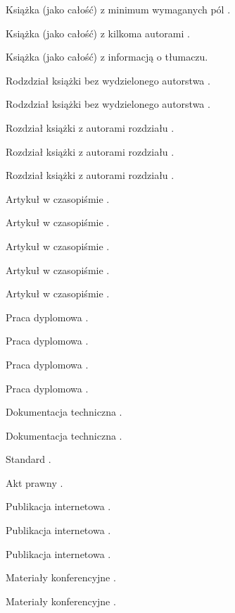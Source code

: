 \documentclass[a4paper, 12pt]{article}
\begin{document}
Książka (jako całość) z minimum wymaganych pól \cite{Gorski2023}.

Książka (jako całość) z kilkoma autorami \cite{Kurczab2016}.


Książka (jako całość) z informacją o tłumaczu. \cite{AlKhalili2022}

Rodzdział książki bez wydzielonego autorstwa \cite{Smith2018}.

Rodzdział książki bez wydzielonego autorstwa \cite{Peterson2019}.

Rozdział książki z autorami rozdziału \cite{Kraus2010}.

Rozdział książki z autorami rozdziału \cite{Isidori2023}.

Rozdział książki z autorami rozdziału \cite{Gregerson2010}.

Artykuł w czasopiśmie \cite{Nowak2023}.

Artykuł w czasopiśmie \cite{Xu2023}.

Artykuł w czasopiśmie \cite{Mashatan2007}.

Artykuł w czasopiśmie \cite{Hwang2006}.

Artykuł w czasopiśmie \cite{Joye2007}.

Praca dyplomowa \cite{Cwik2018}.

Praca dyplomowa \cite{Marszalek2023}.

Praca dyplomowa \cite{Urbanski2023}.

Praca dyplomowa \cite{Otto2004}.

Dokumentacja techniczna \cite{LPC2212}.

Dokumentacja techniczna \cite{NIST-SP-800-22}.

Standard \cite{FIPS140-2}.

Akt prawny \cite{ust2001-09-18}.

Publikacja internetowa \cite{Schneier2017}.

Publikacja internetowa \cite{Craddock2017}.

Publikacja internetowa \cite{MatlabPerformance2015}.

Materiały konferencyjne \cite{Duckworth2019}.

Materiały konferencyjne \cite{Jun2006}.

\printbibliography
\end{document}
